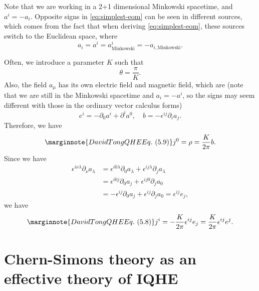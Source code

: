 \documentclass[hyperref, a4paper]{article}
\begin{document}
\begin{note*}{}
    Note that we are working in a 2+1 dimensional Minkowski spacetime, and $a^i = - a_i$. 
    Opposite signs in \eqref{eq:simplest-eom} can be seen in different sources, which comes from 
    the fact that when deriving \eqref{eq:simplest-eom}, these sources switch to the Euclidean 
    space, where 
    \[
        a_i = a^i = a^i_\text{Minkowski} = - a_{i, \text{Minkowski}}.
    \]
\end{note*}

Often, we introduce a parameter $K$ such that  
\begin{equation}
    \theta = \frac{\pi}{K}.
\end{equation}
Also, the field $a_\mu$ has its own electric field and magnetic field, which are (note that we are still in the Minkowski spacetime and $a_i = - a^i$, so the signs may seem different with those in the ordinary vector calculus forms)
\begin{equation}
    e^i = - \partial_0 a^i + \partial^i a^0, \quad b = - \epsilon^{ij} \partial_i a_j.
\end{equation}
Therefore, we have 
\begin{equation} \marginnote{David Tong QHE Eq.~(5.9)}
    j^0 = \rho = \frac{K}{2\pi} b.
\end{equation}
Since we have 
\[
    \begin{aligned}
        \epsilon^{i \nu \lambda} \partial_\nu a_\lambda &= \epsilon^{i 0 \lambda} \partial_0 a_\lambda + \epsilon^{i j \lambda} \partial_j a_\lambda \\
        &= \epsilon^{i 0 j} \partial_0 a_j + \epsilon^{i j 0} \partial_j a_0 \\ 
        &= - \epsilon^{ij} \partial_0 a_j + \epsilon^{ij}  \partial_j a_0 = \epsilon^{ij} e_j ,
    \end{aligned}
\]
we have 
\begin{equation} \marginnote{David Tong QHE Eq.~(5.8)}
    j^i = - \frac{K}{2\pi} \epsilon^{ij} e_j = \frac{K}{2\pi} \epsilon^{ij} e^j.
    \label{eq:current-from-electric-field-chern-simons}
\end{equation}

\section{Chern-Simons theory as an effective theory of IQHE}
\end{document}
